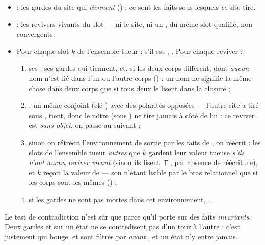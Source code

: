 
\begin{itemize}
  \item {} : les gardes du site qui \emph{tiennent} () ;
        ce sont les faits sous lesquels \emph{ce} site tire.
  \item {} : les revivers vivants du slot  --- ni le site, ni un
        , du même slot qualifié, non convergents.
  \item Pour chaque slot $k$ de l'ensemble tueur : s'il est , .
        Pour chaque reviver  :
        \begin{enumerate}
          \item ses  : ses gardes qui tiennent, et, si les deux corps diffèrent,
                dont \emph{aucun} nom n'est lié dans l'un ou l'autre corps
                () : un nom ne signifie la même chose dans deux corps
                que si tous deux le lisent dans la closure ;
          \item {} : un même conjoint (clé
                ) avec des polarités opposées --- l'autre site a tiré
                sous ,  tient, donc le nôtre (sous ) ne tire jamais à
                côté de lui : ce reviver est \emph{sans objet}, on passe au suivant ;
          \item sinon on rétrécit l'environnement de sortie par les faits de ,
                on réécrit : les slots de l'ensemble tueur \emph{autres} que $k$ gardent leur
                valeur tueuse \emph{s'ils n'ont aucun reviver vivant} (sinon ils lisent
                $\Top$, par absence de réécriture), et $k$ reçoit la valeur de 
                --- son  n'étant lisible par le bras relationnel que si les corps
                sont les mêmes () ;
          \item si les gardes ne sont pas mortes dans cet environnement, .
        \end{enumerate}
\end{itemize}


\begin{piege}
Le test de contradiction n'est sûr que parce qu'il porte sur des faits \emph{invariants}.
Deux gardes  et  sur un état ne se contredisent pas d'un tour à l'autre :
c'est justement  qui bouge.  et  sont filtrés par
 \emph{avant} , et un état n'y entre jamais.
\end{piege}


